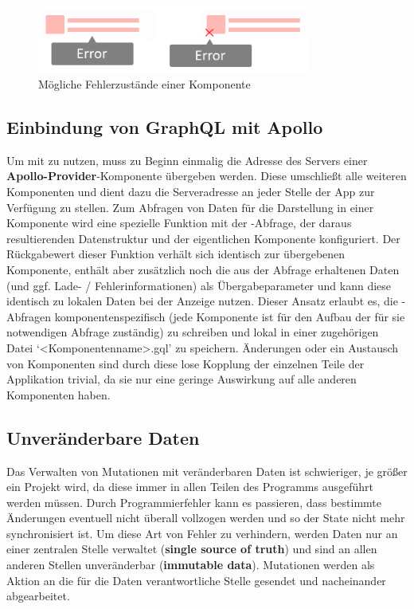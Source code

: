 \begin{figure}
    \centering
    \captionsetup{justification=centering}
    \includegraphics[width=0.8\textwidth]{figures/comp_possible_error_state.png}
        \caption{Mögliche Fehlerzustände einer Komponente}\label{fig:comp_possible_error_state}
\end{figure}

\subsection{Einbindung von GraphQL mit Apollo}
Um  mit  zu nutzen, muss zu Beginn einmalig die Adresse des Servers einer \textbf{Apollo-Provider}-Komponente übergeben werden. Diese umschließt alle weiteren Komponenten und dient dazu die Serveradresse an jeder Stelle der App zur Verfügung zu stellen. Zum Abfragen von Daten für die Darstellung in einer Komponente wird eine spezielle Funktion mit der -Abfrage, der daraus resultierenden Datenstruktur und der eigentlichen Komponente konfiguriert. Der Rückgabewert dieser Funktion verhält sich identisch zur übergebenen Komponente, enthält aber zusätzlich noch die aus der Abfrage erhaltenen Daten (und ggf. Lade- / Fehlerinformationen) als Übergabeparameter und kann diese identisch zu lokalen Daten bei der Anzeige nutzen.
Dieser Ansatz erlaubt es, die -Abfragen komponentenspezifisch (jede Komponente ist für den Aufbau der für sie notwendigen Abfrage zuständig) zu schreiben und lokal in einer zugehörigen Datei `<Komponentenname>.gql' zu speichern. Änderungen oder ein Austausch von Komponenten sind durch diese lose Kopplung der einzelnen Teile der Applikation trivial, da sie nur eine geringe Auswirkung auf alle anderen Komponenten haben.

\subsection{Unveränderbare Daten}
Das Verwalten von Mutationen mit veränderbaren Daten ist schwieriger, je größer ein Projekt wird, da diese immer in allen Teilen des Programms ausgeführt werden müssen. Durch Programmierfehler kann es passieren, dass bestimmte Änderungen eventuell nicht überall vollzogen werden und so der State nicht mehr synchronisiert ist. Um diese Art von Fehler zu verhindern, werden Daten nur an einer zentralen Stelle verwaltet (\textbf{single source of truth}) und sind an allen anderen Stellen unveränderbar (\textbf{immutable data}). Mutationen werden als Aktion an die für die Daten verantwortliche Stelle gesendet und nacheinander abgearbeitet.

